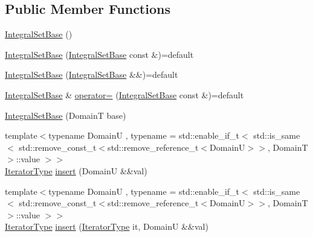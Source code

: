 \subsection*{Public Member Functions}
\begin{DoxyCompactItemize}
\item 
\hyperlink{structvt_1_1term_1_1interval_1_1_integral_set_base_a0826331831d6c87ec6b81a9264f98e12}{Integral\+Set\+Base} ()
\item 
\hyperlink{structvt_1_1term_1_1interval_1_1_integral_set_base_a8584b495b7b88baa0eed6012993dd562}{Integral\+Set\+Base} (\hyperlink{structvt_1_1term_1_1interval_1_1_integral_set_base}{Integral\+Set\+Base} const \&)=default
\item 
\hyperlink{structvt_1_1term_1_1interval_1_1_integral_set_base_a54265fe55a770f1d7dc880f013fdb99c}{Integral\+Set\+Base} (\hyperlink{structvt_1_1term_1_1interval_1_1_integral_set_base}{Integral\+Set\+Base} \&\&)=default
\item 
\hyperlink{structvt_1_1term_1_1interval_1_1_integral_set_base}{Integral\+Set\+Base} \& \hyperlink{structvt_1_1term_1_1interval_1_1_integral_set_base_af96e31d4224f965ce41938b031cc9589}{operator=} (\hyperlink{structvt_1_1term_1_1interval_1_1_integral_set_base}{Integral\+Set\+Base} const \&)=default
\item 
\hyperlink{structvt_1_1term_1_1interval_1_1_integral_set_base_a1e162190ce569f5479d29c2284419980}{Integral\+Set\+Base} (DomainT base)
\item 
{\footnotesize template$<$typename DomainU , typename  = std\+::enable\+\_\+if\+\_\+t$<$      std\+::is\+\_\+same$<$        std\+::remove\+\_\+const\+\_\+t$<$std\+::remove\+\_\+reference\+\_\+t$<$\+Domain\+U$>$$>$, Domain\+T      $>$\+::value    $>$$>$ }\\\hyperlink{structvt_1_1term_1_1interval_1_1_integral_set_base_a111b2ec1ea960a40ba4270be702f11f1}{Iterator\+Type} \hyperlink{structvt_1_1term_1_1interval_1_1_integral_set_base_a7476d33df36a287580cdecc9dd6c2bd1}{insert} (DomainU \&\&val)
\item 
{\footnotesize template$<$typename DomainU , typename  = std\+::enable\+\_\+if\+\_\+t$<$      std\+::is\+\_\+same$<$        std\+::remove\+\_\+const\+\_\+t$<$std\+::remove\+\_\+reference\+\_\+t$<$\+Domain\+U$>$$>$, Domain\+T      $>$\+::value    $>$$>$ }\\\hyperlink{structvt_1_1term_1_1interval_1_1_integral_set_base_a111b2ec1ea960a40ba4270be702f11f1}{Iterator\+Type} \hyperlink{structvt_1_1term_1_1interval_1_1_integral_set_base_a34422ad0f4a5341e700a9264f921381d}{insert} (\hyperlink{structvt_1_1term_1_1interval_1_1_integral_set_base_a111b2ec1ea960a40ba4270be702f11f1}{Iterator\+Type} it, DomainU \&\&val)

\end{DoxyCompactItemize}
